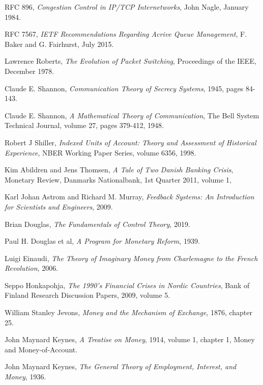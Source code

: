 \begin{thebibliography}{9}
    RFC 896,
    \emph{Congestion Control in IP/TCP Internetworks},
    John Nagle,
    January 1984.

    RFC 7567,
    \emph{IETF Recommendations Regarding Acrive Queue Management},
    F. Baker and G. Fairhurst,
    July 2015.

    Lawrence Roberts,
    \emph{The Evolution of Packet Switching},
    Proceedings of the IEEE,
    December 1978.

    Claude E. Shannon,
    \emph{Communication Theory of Secrecy Systems},
    1945,
    pages 84-143.

    Claude E. Shannon,
    \emph{A Mathematical Theory of Communication},
    The Bell System Technical Journal,
    volume 27,
    pages 379-412,
    1948.

    Robert J Shiller,
    \emph{Indexed Units of Account: Theory and Assessment of Historical Experience},
    NBER Working Paper Series,
    volume 6356,
    1998.

    Kim Abildren and Jens Thomsen,
    \emph{A Tale of Two Danish Banking Crisis},
    Monetary Review,
    Danmarks Nationalbank,
    1st Quarter 2011,
    volume 1,

    Karl Johan Astrom and Richard M. Murray,
    \emph{Feedback Systems: An Introduction for Scientists and Engineers},
    2009.

    Brian Douglas,
    \emph{The Fundamentals of Control Theory},
    2019.

    Paul H. Douglas et al,
    \emph{A Program for Monetary Reform},
    1939.

    Luigi Einaudi,
    \emph{The Theory of Imaginary Money from Charlemagne to the French Revolution},
    2006.

    Seppo Honkapohja,
    \emph{The 1990's Financial Crises in Nordic Countries},
    Bank of Finland Research Discussion Papers,
    2009,
    volume 5.

    William Stanley Jevons,
    \emph{Money and the Mechanism of Exchange},
    1876,
    chapter 25.

    John Maynard Keynes,
    \emph{A Treatise on Money},
    1914,
    volume 1,
    chapter 1,
    Money and Money-of-Account.

    John Maynard Keynes,
    \emph{The General Theory of Employment, Interest, and Money},
    1936.


\end{thebibliography}
